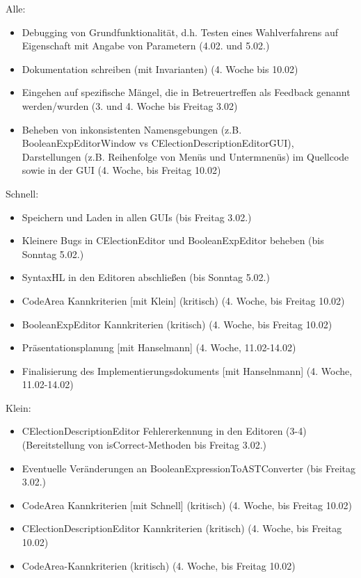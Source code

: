 \documentclass[a4paper]{scrreprt}
\begin{document}
Alle:
\begin{itemize}
\item Debugging von Grundfunktionalität, d.h. Testen eines Wahlverfahrens auf Eigenschaft mit Angabe von Parametern (4.02. und 5.02.)
\item Dokumentation schreiben (mit Invarianten) (4. Woche bis 10.02)
\item Eingehen auf spezifische Mängel, die in Betreuertreffen als Feedback genannt werden/wurden (3. und 4. Woche bis Freitag 3.02)
\item Beheben von inkonsistenten Namensgebungen (z.B. BooleanExpEditorWindow vs CElectionDescriptionEditorGUI), Darstellungen (z.B. Reihenfolge von Menüs und Untermnenüs) im Quellcode sowie in der GUI (4. Woche, bis Freitag 10.02)
\end{itemize}
\vspace{8mm}
Schnell:
\begin{itemize}
\item Speichern und Laden in allen GUIs (bis Freitag 3.02.)
\item Kleinere Bugs in CElectionEditor und BooleanExpEditor beheben (bis Sonntag 5.02.)
\item SyntaxHL in den Editoren abschließen (bis Sonntag 5.02.)
\item CodeArea Kannkriterien [mit Klein] (kritisch) (4. Woche, bis Freitag 10.02)
\item BooleanExpEditor Kannkriterien (kritisch) (4. Woche, bis Freitag 10.02)
\item Präsentationsplanung [mit Hanselmann] (4. Woche, 11.02-14.02)
\item Finalisierung des Implementierungsdokuments [mit Hanselnmann] (4. Woche, 11.02-14.02)
\end{itemize}
\vspace{8mm}
Klein:
\begin{itemize}
\item CElectionDescriptionEditor Fehlererkennung in den Editoren (3-4) (Bereitstellung von isCorrect-Methoden bis Freitag 3.02.)
\item Eventuelle Veränderungen an BooleanExpressionToASTConverter (bis Freitag 3.02.)
\item CodeArea Kannkriterien [mit Schnell] (kritisch) (4. Woche, bis Freitag 10.02)
\item CElectionDescriptionEditor Kannkriterien (kritisch) (4. Woche, bis Freitag 10.02)
\item CodeArea-Kannkriterien (kritisch) (4. Woche, bis Freitag 10.02)
\end{itemize} 
\end{document}
